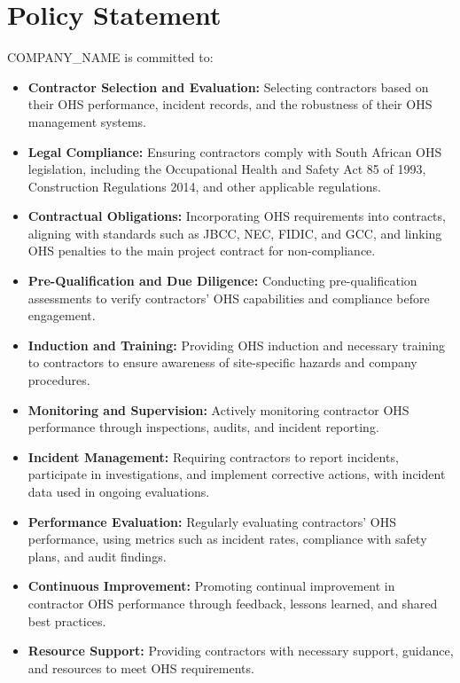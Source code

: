 \documentclass[12pt]{article}
\begin{document}
\section{Policy Statement}
{{COMPANY_NAME}} is committed to:
\begin{itemize}
    \item \textbf{Contractor Selection and Evaluation:} Selecting contractors based on their OHS performance, incident records, and the robustness of their OHS management systems.
    \item \textbf{Legal Compliance:} Ensuring contractors comply with South African OHS legislation, including the Occupational Health and Safety Act 85 of 1993, Construction Regulations 2014, and other applicable regulations.
    \item \textbf{Contractual Obligations:} Incorporating OHS requirements into contracts, aligning with standards such as JBCC, NEC, FIDIC, and GCC, and linking OHS penalties to the main project contract for non-compliance.
    \item \textbf{Pre-Qualification and Due Diligence:} Conducting pre-qualification assessments to verify contractors’ OHS capabilities and compliance before engagement.
    \item \textbf{Induction and Training:} Providing OHS induction and necessary training to contractors to ensure awareness of site-specific hazards and company procedures.
    \item \textbf{Monitoring and Supervision:} Actively monitoring contractor OHS performance through inspections, audits, and incident reporting.
    \item \textbf{Incident Management:} Requiring contractors to report incidents, participate in investigations, and implement corrective actions, with incident data used in ongoing evaluations.
    \item \textbf{Performance Evaluation:} Regularly evaluating contractors’ OHS performance, using metrics such as incident rates, compliance with safety plans, and audit findings.
    \item \textbf{Continuous Improvement:} Promoting continual improvement in contractor OHS performance through feedback, lessons learned, and shared best practices.
    \item \textbf{Resource Support:} Providing contractors with necessary support, guidance, and resources to meet OHS requirements.
\end{itemize}
\end{document}
